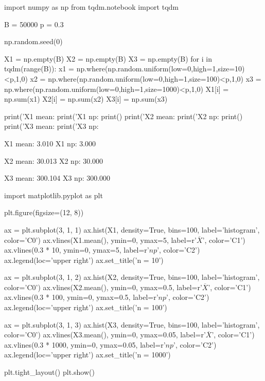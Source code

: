 \begin{python}
import numpy as np
from tqdm.notebook import tqdm

B = 50000
p = 0.3

np.random.seed(0)

X1 = np.empty(B)
X2 = np.empty(B)
X3 = np.empty(B)
for i in tqdm(range(B)):
    x1 = np.where(np.random.uniform(low=0,high=1,size=10)<p,1,0)
    x2 = np.where(np.random.uniform(low=0,high=1,size=100)<p,1,0)
    x3 = np.where(np.random.uniform(low=0,high=1,size=1000)<p,1,0)
    X1[i] = np.sum(x1)
    X2[i] = np.sum(x2)
    X3[i] = np.sum(x3)
\end{python}

\begin{python}
print('X1 mean: %
print('X1 np:   %
print()
print('X2 mean: %
print('X2 np:   %
print()
print('X3 mean: %
print('X3 np:   %
\end{python}

\begin{console}
X1 mean: 3.010
X1 np:   3.000

X2 mean: 30.013
X2 np:   30.000

X3 mean: 300.104
X3 np:   300.000
\end{console}

\begin{python}
import matplotlib.pyplot as plt

plt.figure(figsize=(12, 8))

ax = plt.subplot(3, 1, 1)
ax.hist(X1, density=True, bins=100, label='histogram', color='C0')
ax.vlines(X1.mean(), ymin=0, ymax=5, label=r'$\overline{X}$', color='C1')
ax.vlines(0.3 * 10, ymin=0, ymax=5, label=r'$np$', color='C2')
ax.legend(loc='upper right')
ax.set_title('n = 10')

ax = plt.subplot(3, 1, 2)
ax.hist(X2, density=True, bins=100, label='histogram', color='C0')
ax.vlines(X2.mean(), ymin=0, ymax=0.5, label=r'$\overline{X}$', color='C1')
ax.vlines(0.3 * 100, ymin=0, ymax=0.5, label=r'$np$', color='C2')
ax.legend(loc='upper right')
ax.set_title('n = 100')

ax = plt.subplot(3, 1, 3)
ax.hist(X3, density=True, bins=100, label='histogram', color='C0')
ax.vlines(X3.mean(), ymin=0, ymax=0.05, label=r'$\overline{X}$', color='C1')
ax.vlines(0.3 * 1000, ymin=0, ymax=0.05, label=r'$np$', color='C2')
ax.legend(loc='upper right')
ax.set_title('n = 1000')

plt.tight_layout()
plt.show()
\end{python}

